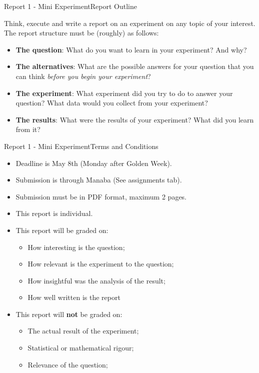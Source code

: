 \documentclass[t]{beamer}
\begin{document}
\begin{ftst}
  {Report 1 - Mini Experiment}{Report Outline}

  Think, execute and write a report on an experiment on any topic of
  your interest. The report structure must be (roughly) as follows:

  \vone

  \begin{itemize}
  \item {\bf The question}: What do you want to learn in your experiment? And why?
  \item {\bf The alternatives}: What are the possible answers for your
    question that you can think \emph{before you begin your
      experiment}?
  \item {\bf The experiment}: What experiment did you try to do to
    answer your question? What data would you collect from your experiment?
  \item {\bf The results}: What were the results of your experiment?
    What did you learn from it?
  \end{itemize}
\end{ftst}

\begin{ftst}
  {Report 1 - Mini Experiment}{Terms and Conditions}

  \begin{itemize}
  \item Deadline is May 8th (Monday after Golden Week).
  \item Submission is through Manaba (See assignments tab).
  \item Submission must be in PDF format, maximum 2 pages.
  \item This report is individual.
  \item This report will be graded on:
    \begin{itemize}
    \item How interesting is the question;
    \item How relevant is the experiment to the question;
    \item How insightful was the analysis of the result;
    \item How well written is the report
    \end{itemize}
  \item This report will {\bf not} be graded on:
    \begin{itemize}
    \item The actual result of the experiment;
    \item Statistical or mathematical rigour;
    \item Relevance of the question;
    \end{itemize}
  \end{itemize}
\end{ftst}
\end{document}
